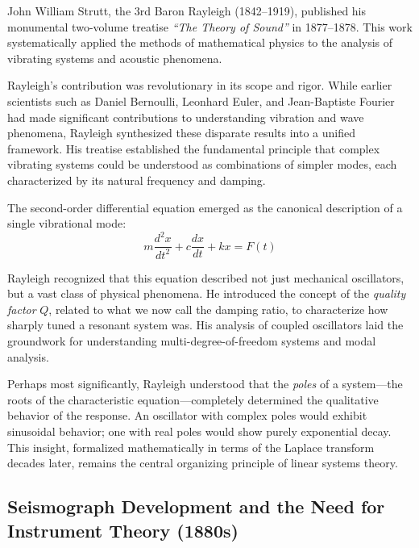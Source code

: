 \begin{historicalbox}
John William Strutt, the 3rd Baron Rayleigh (1842--1919), published his monumental two-volume treatise \textit{``The Theory of Sound''} in 1877--1878. This work systematically applied the methods of mathematical physics to the analysis of vibrating systems and acoustic phenomena.
\end{historicalbox}

Rayleigh's contribution was revolutionary in its scope and rigor. While earlier scientists such as Daniel Bernoulli, Leonhard Euler, and Jean-Baptiste Fourier had made significant contributions to understanding vibration and wave phenomena, Rayleigh synthesized these disparate results into a unified framework. His treatise established the fundamental principle that complex vibrating systems could be understood as combinations of simpler modes, each characterized by its natural frequency and damping.

The second-order differential equation emerged as the canonical description of a single vibrational mode:
\begin{equation}
m\frac{d^2x}{dt^2} + c\frac{dx}{dt} + kx = F(t)
\label{eq:rayleigh_oscillator}
\end{equation}

Rayleigh recognized that this equation described not just mechanical oscillators, but a vast class of physical phenomena. He introduced the concept of the \textit{quality factor} $Q$, related to what we now call the damping ratio, to characterize how sharply tuned a resonant system was. His analysis of coupled oscillators laid the groundwork for understanding multi-degree-of-freedom systems and modal analysis.

Perhaps most significantly, Rayleigh understood that the \textit{poles} of a system---the roots of the characteristic equation---completely determined the qualitative behavior of the response. An oscillator with complex poles would exhibit sinusoidal behavior; one with real poles would show purely exponential decay. This insight, formalized mathematically in terms of the Laplace transform decades later, remains the central organizing principle of linear systems theory.

\subsection{Seismograph Development and the Need for Instrument Theory (1880s)}

